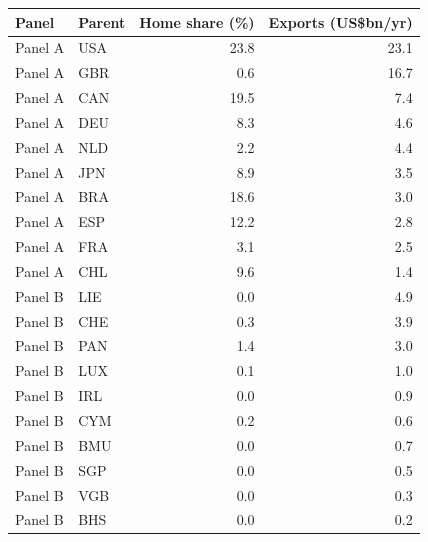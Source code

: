 \begin{tabular}{llrr}
\toprule
Panel & Parent & Home share (\%) & Exports (US\$bn/yr) \\
\midrule
Panel A & USA & 23.8 & 23.1 \\
Panel A & GBR & 0.6 & 16.7 \\
Panel A & CAN & 19.5 & 7.4 \\
Panel A & DEU & 8.3 & 4.6 \\
Panel A & NLD & 2.2 & 4.4 \\
Panel A & JPN & 8.9 & 3.5 \\
Panel A & BRA & 18.6 & 3.0 \\
Panel A & ESP & 12.2 & 2.8 \\
Panel A & FRA & 3.1 & 2.5 \\
Panel A & CHL & 9.6 & 1.4 \\
\midrule
Panel B & LIE & 0.0 & 4.9 \\
Panel B & CHE & 0.3 & 3.9 \\
Panel B & PAN & 1.4 & 3.0 \\
Panel B & LUX & 0.1 & 1.0 \\
Panel B & IRL & 0.0 & 0.9 \\
Panel B & CYM & 0.2 & 0.6 \\
Panel B & BMU & 0.0 & 0.7 \\
Panel B & SGP & 0.0 & 0.5 \\
Panel B & VGB & 0.0 & 0.3 \\
Panel B & BHS & 0.0 & 0.2 \\
\bottomrule
\end{tabular}
